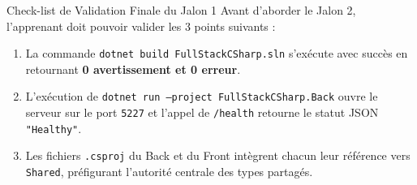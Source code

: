 \documentclass[a4paper,11pt]{report}
\begin{document}
\vspace{0.2cm}

\begin{bestpracticebox}{Check-list de Validation Finale du Jalon 1}
Avant d'aborder le Jalon 2, l'apprenant doit pouvoir valider les 3 points suivants :
\begin{enumerate}
    \item La commande \texttt{dotnet build FullStackCSharp.sln} s'exécute avec succès en retournant \textbf{0 avertissement et 0 erreur}.
    \item L'exécution de \texttt{dotnet run --project FullStackCSharp.Back} ouvre le serveur sur le port \texttt{5227} et l'appel de \texttt{/health} retourne le statut JSON \texttt{"Healthy"}.
    \item Les fichiers \texttt{.csproj} du Back et du Front intègrent chacun leur référence vers \texttt{Shared}, préfigurant l'autorité centrale des types partagés.
\end{enumerate}
\end{bestpracticebox}

\newpage
\end{document}
